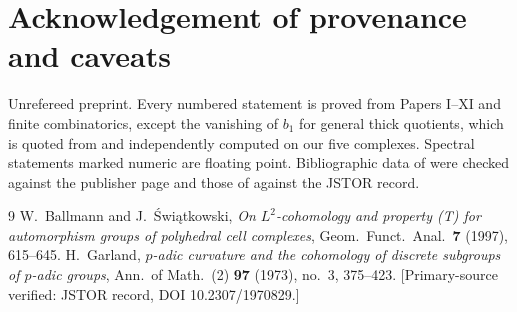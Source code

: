 \documentclass[11pt]{amsart}
\numberwithin{equation}{section}
\theoremstyle{definition}
\theoremstyle{remark}
\begin{document}
\section*{Acknowledgement of provenance and caveats}

Unrefereed preprint. Every numbered statement is proved from Papers I--XI and finite
combinatorics, except the vanishing of $b_1$ for general thick quotients, which is quoted
from \cite{Ga,BSw} and independently computed on our five complexes. Spectral statements
marked numeric are floating point. Bibliographic data of \cite{BSw} were checked against
the publisher page and those of \cite{Ga} against the JSTOR record.

\begin{thebibliography}{9}
 W.~Ballmann and J.~\'Swi\k{a}tkowski, \emph{On $L^{2}$-cohomology and property
(T) for automorphism groups of polyhedral cell complexes}, Geom.\ Funct.\ Anal.\ \textbf{7}
(1997), 615--645.
 H.~Garland, \emph{$p$-adic curvature and the cohomology of discrete subgroups
of $p$-adic groups}, Ann.\ of Math.\ (2) \textbf{97} (1973), no.~3, 375--423.
[Primary-source verified: JSTOR record, DOI 10.2307/1970829.]
\end{thebibliography}
\end{document}

